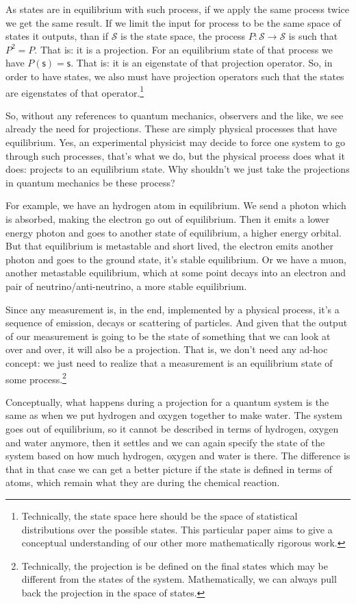 \documentclass[letterpaper]{article}
\theoremstyle{plain}%
\theoremstyle{definition}
\theoremstyle{remark}
\begin{document}
As states are in equilibrium with such process, if we apply the same process twice we get the same result. If we limit the input for process to be the same space of states it outputs, than if $\mathcal{S}$ is the state space, the process $P : \mathcal{S} \to \mathcal{S}$ is such that $P^2 = P$. That is: it is a projection. For an equilibrium state of that process we have $P(\mathsf{s}) = \mathsf{s}$. That is: it is an eigenstate of that projection operator. So, in order to have states, we also must have projection operators such that the states are eigenstates of that operator.\footnote{Technically, the state space here should be the space of statistical distributions over the possible states. This particular paper aims to give a conceptual understanding of our other more mathematically rigorous work.}

So, without any references to quantum mechanics, observers and the like, we see already the need for projections. These are simply physical processes that have equilibrium. Yes, an experimental physicist may decide to force one system to go through such processes, that's what we do, but the physical process does what it does: projects to an equilibrium state. Why shouldn't we just take the projections in quantum mechanics be these process?

For example, we have an hydrogen atom in equilibrium. We send a photon which is absorbed, making the electron go out of equilibrium. Then it emits a lower energy photon and goes to another state of equilibrium, a higher energy orbital. But that equilibrium is metastable and short lived, the electron emits another photon and goes to the ground state, it's stable equilibrium. Or we have a muon, another metastable equilibrium, which at some point decays into an electron and pair of neutrino/anti-neutrino, a more stable equilibrium.

Since any measurement is, in the end, implemented by a physical process, it's a sequence of emission, decays or scattering of particles. And given that the output of our measurement is going to be the state of something that we can look at over and over, it will also be a projection. That is, we don't need any ad-hoc concept: we just need to realize that a measurement is an equilibrium state of some process.\footnote{Technically, the projection is be defined on the final states which may be different from the states of the system. Mathematically, we can always pull back the projection in the space of states.}

Conceptually, what happens during a projection for a quantum system is the same as when we put hydrogen and oxygen together to make water. The system goes out of equilibrium, so it cannot be described in terms of hydrogen, oxygen and water anymore, then it settles and we can again specify the state of the system based on how much hydrogen, oxygen and water is there. The difference is that in that case we can get a better picture if the state is defined in terms of atoms, which remain what they are during the chemical reaction.
\end{document}
